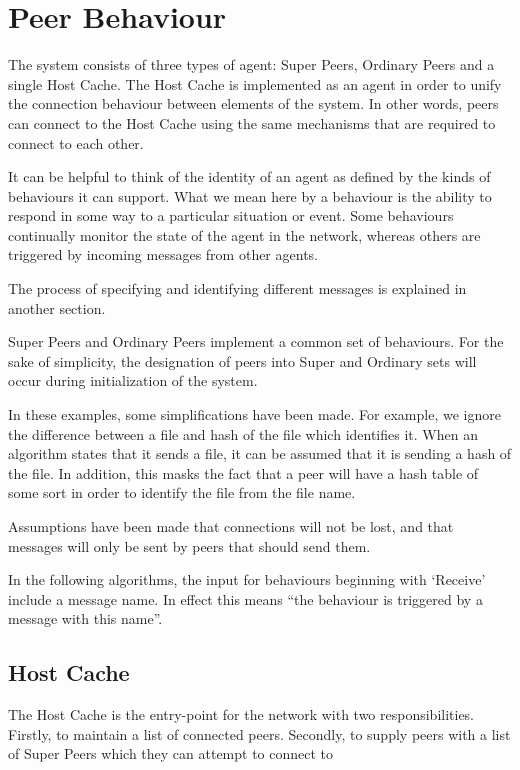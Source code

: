 \section{Peer Behaviour}

\secttoc

The system consists of three types of agent: Super Peers, Ordinary Peers and a
single Host Cache.  The Host Cache is implemented as an agent in order to unify
the connection behaviour between elements of the system.  In other words, peers
can connect to the Host Cache using the same mechanisms that are required to
connect to each other.

It can be helpful to think of the identity of an agent as defined by the kinds
of behaviours it can support. What we mean here by a behaviour is the ability to
respond in some way to a particular situation or event.  Some behaviours
continually monitor the state of the agent in the network, whereas others
are triggered by incoming messages from other agents.

The process of specifying and identifying different messages is explained in
another section.

Super Peers and Ordinary Peers implement a common set of behaviours. For
the sake of simplicity, the designation of peers into Super and Ordinary sets
will occur during initialization of the system.

In these examples, some simplifications have been made.  For example, we ignore
the difference between a file and hash of the file which identifies it. When an
algorithm states that it sends a file, it can be assumed that it is sending a
hash of the file.  In addition, this masks the fact that a peer will have a hash
table of some sort in order to identify the file from the file name.

Assumptions have been made that connections will not be lost, and that messages
will only be sent by peers that should send them.

In the following algorithms, the input for behaviours beginning with `Receive'
include a message name.  In effect this means ``the behaviour is triggered by a
message with this name''.

\subsection{Host Cache}

The Host Cache is the entry-point for the network with two responsibilities.
Firstly, to maintain a list of connected peers. Secondly, to supply peers with a
list of Super Peers which they can attempt to connect to

